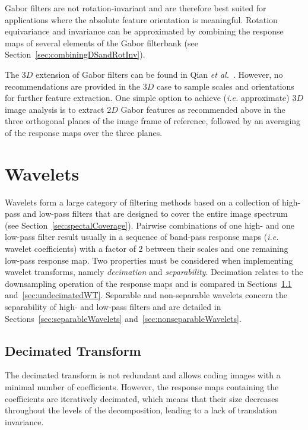\documentclass[fleqn,a4paper,oneside,openany]{book}
\begin{document}
Gabor filters are not rotation-invariant and are therefore best suited for applications where the absolute feature orientation is meaningful.
Rotation equivariance and invariance can be approximated by combining the response maps of several elements of the Gabor filterbank (see Section~\ref{sec:combiningDSandRotInv}).

The 3$D$ extension of Gabor filters can be found in Qian \textit{et al.}~\cite{Qian2006}. However, no recommendations are provided in the 3$D$ case to sample scales and orientations for further feature extraction.
One simple option to achieve (\textit{i.e.} approximate) 3$D$ image analysis is to extract 2$D$ Gabor features as recommended above in the three orthogonal planes  of the image frame of reference, followed by an averaging of the response maps over the three planes.
%
\section{Wavelets}\label{sec:wavelets}
%
Wavelets form a large category of filtering methods based on a collection of high-pass and low-pass filters that are designed to cover the entire image spectrum~\cite{Mallat1989} (see Section~\ref{sec:spectalCoverage}).
Pairwise combinations of one high- and one low-pass filter result usually in a sequence of band-pass response maps (\textit{i.e.} wavelet coefficients) with a factor of 2 between their scales and one remaining low-pass response map.
Two properties must be considered when implementing wavelet transforms, namely \emph{decimation} and \emph{separability}.
Decimation relates to the downsampling operation of the response maps and is compared in Sections~\ref{sec:decimatedWT} and~\ref{sec:undecimatedWT}.
Separable and non-separable wavelets concern the separability of high- and low-pass filters and are detailed in Sections~\ref{sec:separableWavelets} and~\ref{sec:nonseparableWavelets}.
%
\subsection{Decimated Transform}\label{sec:decimatedWT}
%
The decimated transform is not redundant and allows coding images with a minimal number of coefficients.
However, the response maps containing the coefficients are iteratively decimated, which means that their size decreases throughout the levels of the decomposition, leading to a lack of translation invariance.
\end{document}
